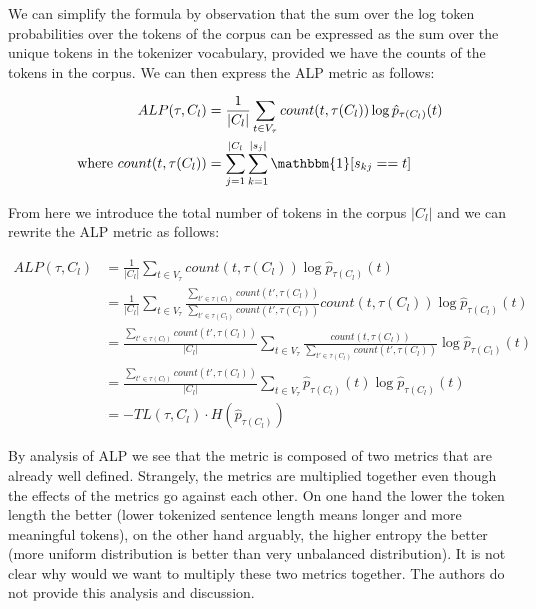 We can simplify the formula by observation that the sum over the log token probabilities over the tokens of the corpus can be expressed as the sum over the unique tokens in the tokenizer vocabulary, provided we have the counts of the tokens in the corpus. We can then express the ALP metric as follows: 

\begin{align}
    ALP(\tau, C_l) &= \frac{1}{|C_l|} \sum_{t \in V_\tau} count(t, \tau(C_l)) \log \hat{p}_{\tau(C_l)}(t) \\
    \text{where}~count(t, \tau(C_l)) &= \sum_{j=1}^{|C_l} \sum_{k=1}^{|s_j|} \mathbbm{1}[s_{kj} == t]
\end{align}

From here we introduce the total number of tokens in the corpus $|C_l|$ and we can rewrite the ALP metric as follows:

\begin{align}
ALP(\tau, C_l) &= \frac{1}{|C_l|} \sum_{t \in V_\tau} count(t, \tau(C_l)) \log \hat{p}_{\tau(C_l)}(t) \\
&= \frac{1}{|C_l|} \sum_{t \in V_\tau} \frac{\sum_{t' \in \tau(C_l)} count(t', \tau(C_l))}{\sum_{t' \in \tau(C_l)} count(t', \tau(C_l))} count(t, \tau(C_l)) \log \hat{p}_{\tau(C_l)}(t) \\
&= \frac{\sum_{t' \in \tau(C_l)} count(t', \tau(C_l))}{|C_l|} \sum_{t \in V_\tau} \frac{count(t, \tau(C_l))}{\sum_{t' \in \tau(C_l)} count(t', \tau(C_l))} \log \hat{p}_{\tau(C_l)}(t) \\
&= \frac{\sum_{t' \in \tau(C_l)} count(t', \tau(C_l))}{|C_l|} \sum_{t \in V_\tau} \hat{p}_{\tau(C_l)}(t) \log \hat{p}_{\tau(C_l)}(t) \\
&= - TL(\tau, C_l) \cdot H(\hat{p}_{\tau(C_l)})
\end{align}


By analysis of ALP we see that the metric is composed of two metrics that are already well defined. Strangely, the metrics are multiplied together even though the effects of the metrics go against each other. On one hand the lower the token length the better (lower tokenized sentence length means longer and more meaningful tokens), on the other hand arguably, the higher entropy the better (more uniform distribution is better than very unbalanced distribution). It is not clear why would we want to multiply these two metrics together. The authors do not provide this analysis and discussion. 

